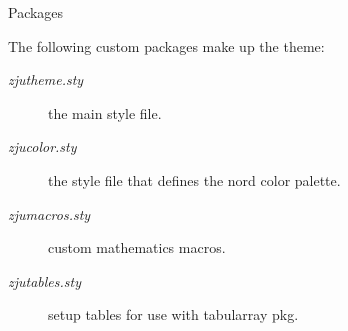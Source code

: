 \documentclass[\string~/GitHub/sthlmNordBeamerTheme/sthlmNordLightDemo.tex]{subfiles}
\begin{document}
\begin{frame}[t,fragile]{Packages}

	The following custom packages make up the \snord theme:
	\begin{description}
		\item[\textit{zjutheme.sty}] the main style file.
		\item[\textit{zjucolor.sty}] the style file that defines the nord color palette.
		\item[\textit{zjumacros.sty}] custom mathematics macros.
		\item[\textit{zjutables.sty}] setup tables for use with tabularray pkg.
	\end{description}

\end{frame}
\end{document}
